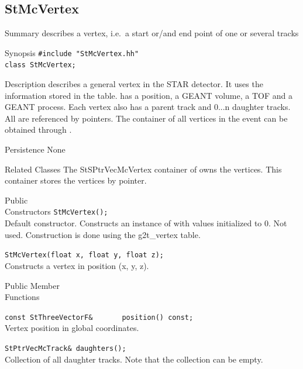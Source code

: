 \subsection{StMcVertex}
\label{sec:StMcVertex}
\begin{Entry}
\item[Summary]
     describes a vertex, i.e.~a start or/and end point of one
    or several tracks

\item[Synopsis]
    \verb+#include "StMcVertex.hh"+\\
    \verb+class StMcVertex;+\\

\item[Description]
         describes a general vertex in the STAR detector.
    It uses the information stored in the 
    table.  has a position, a
    GEANT volume, a TOF and a GEANT process. Each vertex also has
    a parent track and 0...n daughter tracks. All are
    referenced by pointers.
    The container of all vertices in the event can be obtained
    through .

\item[Persistence]
    None

\item[Related Classes]
    The StSPtrVecMcVertex container of  owns the
    vertices. This container stores the
    vertices by pointer. 

\item[Public\\ Constructors]
    \verb+StMcVertex();+\\
    Default constructor. Constructs an instance of  with
    values initialized to 0.  Not used.  Construction is done
    using the g2t\_vertex table.

    \verb+StMcVertex(float x, float y, float z);+\\
    Constructs a vertex in position (x, y, z).

\item[Public Member\\ Functions]

    \verb+const StThreeVectorF&       position() const;+\\
    Vertex position in global coordinates.

    \verb+StPtrVecMcTrack& daughters();+\\
    Collection of all daughter tracks. Note that
    the collection can be empty.


\end{Entry}
